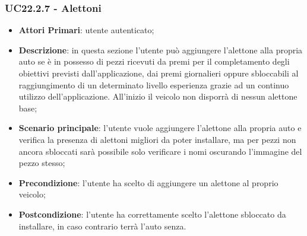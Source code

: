 \subsubsection{UC22.2.7 - Alettoni}
\begin{itemize}
	\item \textbf{Attori Primari}: utente autenticato;
	\item \textbf{Descrizione}: in questa sezione l'utente può aggiungere l'alettone alla propria auto se è in possesso di pezzi ricevuti da premi per il completamento degli obiettivi previsti dall'applicazione, dai premi giornalieri oppure sbloccabili al raggiungimento di un determinato livello esperienza grazie ad un continuo utilizzo dell'applicazione.
	All'inizio il veicolo non disporrà di nessun alettone base;
	\item \textbf{Scenario principale}: l'utente vuole aggiungere l'alettone alla propria auto e verifica la presenza di alettoni migliori da poter installare, ma per pezzi non ancora sbloccati sarà possibile solo verificare i nomi oscurando l'immagine del pezzo stesso;
	\item \textbf{Precondizione}: l'utente ha scelto di aggiungere un alettone al proprio veicolo; 
	\item \textbf{Postcondizione}: l'utente ha correttamente scelto l'alettone sbloccato da installare, in caso contrario terrà l'auto senza.
\end{itemize} 
